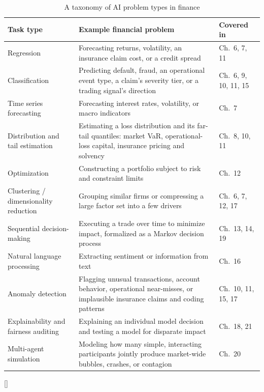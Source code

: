 \documentclass[../ai_in_finance]{subfiles}
\begin{document}
\begin{table}[htbp]
\centering
\begin{lrbox}{\bookmeasuredbox}
\begin{tabular}{p{2.6cm}p{6.0cm}p{2.4cm}}
\toprule
Task type & Example financial problem & Covered in \\
\midrule
Regression & Forecasting returns, volatility, an insurance claim cost, or a credit spread & Ch.~6, 7, 11 \\
Classification & Predicting default, fraud, an operational event type, a claim's severity tier, or a trading signal's direction & Ch.~6, 9, 10, 11, 15 \\
Time series forecasting & Forecasting interest rates, volatility, or macro indicators & Ch.~7 \\
Distribution and tail estimation & Estimating a loss distribution and its far-tail quantiles: market VaR, operational-loss capital, insurance pricing and solvency & Ch.~8, 10, 11 \\
Optimization & Constructing a portfolio subject to risk and constraint limits & Ch.~12 \\
Clustering / dimensionality reduction & Grouping similar firms or compressing a large factor set into a few drivers & Ch.~6, 7, 12, 17 \\
Sequential decision-making & Executing a trade over time to minimize impact, formalized as a Markov decision process & Ch.~13, 14, 19 \\
Natural language processing & Extracting sentiment or information from text & Ch.~16 \\
Anomaly detection & Flagging unusual transactions, account behavior, operational near-misses, or implausible insurance claims and coding patterns & Ch.~10, 11, 15, 17 \\
Explainability and fairness auditing & Explaining an individual model decision and testing a model for disparate impact & Ch.~18, 21 \\
Multi-agent simulation & Modeling how many simple, interacting participants jointly produce market-wide bubbles, crashes, or contagion & Ch.~20 \\
\bottomrule
\end{tabular}
\end{lrbox}
\ifdim\wd\bookmeasuredbox<0.65\linewidth
\setlength{\bookcapwidth}{0.65\linewidth}
\else
\setlength{\bookcapwidth}{\wd\bookmeasuredbox}
\fi
{}[\bookcapwidth]{
\usebox{\bookmeasuredbox}
}{
\caption{A taxonomy of AI problem types in finance}
\label{tab:problem_taxonomy}
}
\end{table}
\end{document}
